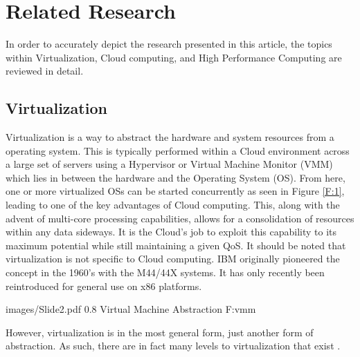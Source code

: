 
\chapter{Related Research}
\label{chap:related}

In order to accurately depict the research presented in this article, the topics within Virtualization,  Cloud computing, and High Performance Computing are reviewed in detail. 

\section{Virtualization}
\label{sec:virtualization}


Virtualization is a way to abstract the hardware and system resources from a operating system.  This is typically performed  within a Cloud environment across a large set of servers using a Hypervisor or Virtual Machine Monitor (VMM) which lies in between the hardware and the Operating System (OS). From here, one or more virtualized OSs can be started concurrently as seen in Figure \ref{F:1}, leading to one of the key advantages of Cloud computing.  This, along with the advent of multi-core processing capabilities, allows for a consolidation of resources within any data sideways.  It is the Cloud's job to exploit this capability to its maximum potential while still maintaining a given QoS. It should be noted that virtualization is not specific to Cloud computing. IBM originally pioneered the concept in the 1960's with the M44/44X systems.  It has only recently been reintroduced for general use on x86 platforms. 


  {images/Slide2.pdf}
  {0.8}
  {Virtual Machine Abstraction}
  {F:vmm}
 

However, virtualization is in the most general form, just another form of abstraction. As such, there are in fact many levels to virtualization that exist \cite{hwang2013distributed}. 


